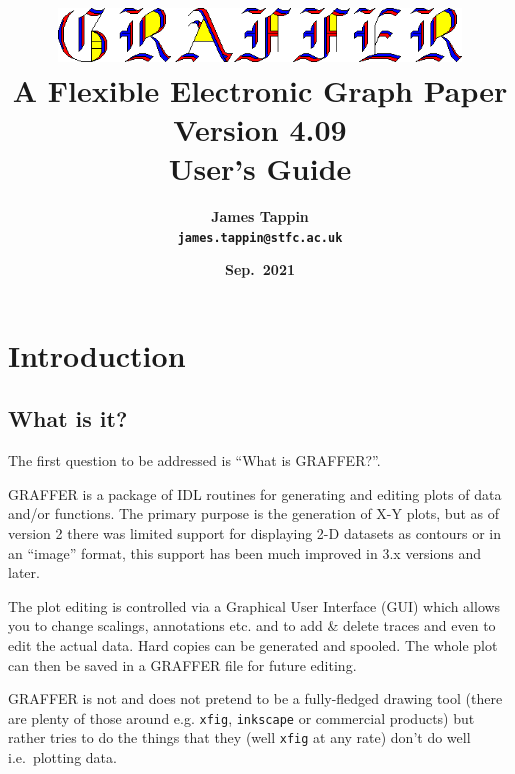 \documentclass[11pt,twoside,english]{article}
\begin{document}
\title{\includegraphics[width=0.80\textwidth]{logo} \\
  A Flexible Electronic Graph Paper\\
  Version 4.09\\
  User's Guide}

\author{\textsf{\textbf{\Large James Tappin}}\\
  \texttt{\textbf{\Large james.tappin@stfc.ac.uk}}}

\date{\textsf{\textbf{\large Sep.\ 2021}}}

\maketitle

\begin{multicols}{2}
  \tableofcontents{}
\end{multicols}

\section{Introduction}


\subsection{What is it?}

The first question to be addressed is {}``What is GRAFFER?''.

GRAFFER is a package of IDL routines for generating and editing plots
of data and/or functions. The primary purpose is the generation of X-Y
plots, but as of version 2 there was limited support for displaying 2-D
datasets as contours or in an {}``image'' format, this support has been
much improved in 3.x versions and later.

The plot editing is controlled via a Graphical User Interface (GUI)
which allows you to change scalings, annotations etc. and to add \&
delete traces and even to edit the actual data. Hard copies can be
generated and spooled. The whole plot can then be saved in a GRAFFER
file for future editing.

GRAFFER is not and does not pretend to be a fully-fledged drawing tool
(there are plenty of those around e.g. \texttt{xfig},
\texttt{inkscape} or commercial products) but rather tries to do the
things that they (well \texttt{xfig} at any rate) don't do well i.e.\
plotting data.
\end{document}
